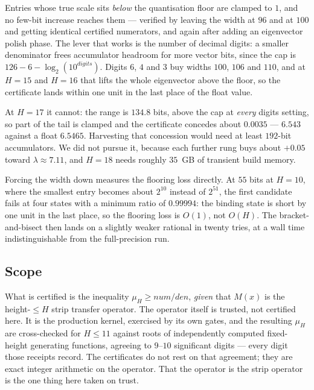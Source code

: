 \documentclass[11pt]{article}
\begin{document}
Entries whose true scale sits \emph{below} the quantisation floor are clamped to
$1$, and no few-bit increase reaches them --- verified by leaving the width at
$96$ and at $100$ and getting identical certified numerators, and again after
adding an eigenvector polish phase. The lever that works is the number of
decimal digits: a smaller denominator frees accumulator headroom for more vector
bits, since the cap is $126 - 6 - \log_2(10^{\mathit{digits}})$. Digits $6$, $4$
and $3$ buy widths $100$, $106$ and $110$, and at $H = 15$ and $H = 16$ that
lifts the whole eigenvector above the floor, so the certificate lands within one
unit in the last place of the float value.

At $H = 17$ it cannot: the range is $134.8$ bits, above the cap at \emph{every}
digits setting, so part of the tail is clamped and the certificate concedes about
$0.0035$ --- $6.543$ against a float $6.5465$. Harvesting that concession would
need at least $192$-bit accumulators. We did not pursue it, because each further
rung buys about $+0.05$ toward $\lambda \approx 7.11$, and $H = 18$ needs roughly
$35$~GB of transient build memory.

Forcing the width down measures the flooring loss directly. At $55$ bits at
$H = 10$, where the smallest entry becomes about $2^{10}$ instead of $2^{51}$,
the first candidate fails at four states with a minimum ratio of $0.99994$: the
binding state is short by one unit in the last place, so the flooring loss is
$O(1)$, not $O(H)$.
The bracket-and-bisect then lands on a slightly weaker rational in twenty tries,
at a wall time indistinguishable from the full-precision run.

\subsection{Scope}
\label{sec:honest}

What is certified is the inequality $\mu_H \ge \mathit{num}/\mathit{den}$,
\emph{given} that $M(x)$ is the height-$\le H$ strip transfer operator. The
operator itself is trusted, not certified here. It is the production kernel,
exercised by its own gates, and the resulting $\mu_H$ are cross-checked for
$H \le 11$ against roots of independently computed fixed-height generating
functions, agreeing to $9$--$10$ significant digits --- every digit those receipts
record. The certificates do not rest on that agreement; they are exact integer
arithmetic on the operator. That the operator is the strip operator is the one
thing here taken on trust.
\end{document}
